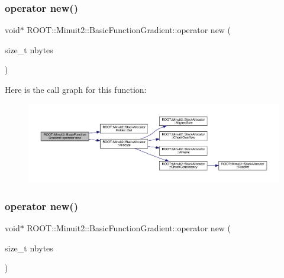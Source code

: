 \subsubsection{\texorpdfstring{operator new()}{operator new()}\hspace{0.1cm}{\footnotesize\ttfamily [1/2]}}
{\footnotesize\ttfamily void$\ast$ R\+O\+O\+T\+::\+Minuit2\+::\+Basic\+Function\+Gradient\+::operator new (\begin{DoxyParamCaption}\item[{size\+\_\+t}]{nbytes }\end{DoxyParamCaption})\hspace{0.3cm}{\ttfamily [inline]}}

Here is the call graph for this function\+:
\nopagebreak
\begin{figure}[H]
\begin{center}
\leavevmode
\includegraphics[width=350pt]{db/d85/classROOT_1_1Minuit2_1_1BasicFunctionGradient_a2b08ebb0074a43cfca91f74991c660d5_cgraph}
\end{center}
\end{figure}
\mbox{\label{classROOT_1_1Minuit2_1_1BasicFunctionGradient_a2b08ebb0074a43cfca91f74991c660d5}} 
\subsubsection{\texorpdfstring{operator new()}{operator new()}\hspace{0.1cm}{\footnotesize\ttfamily [2/2]}}
{\footnotesize\ttfamily void$\ast$ R\+O\+O\+T\+::\+Minuit2\+::\+Basic\+Function\+Gradient\+::operator new (\begin{DoxyParamCaption}\item[{size\+\_\+t}]{nbytes }\end{DoxyParamCaption})\hspace{0.3cm}{\ttfamily [inline]}}

